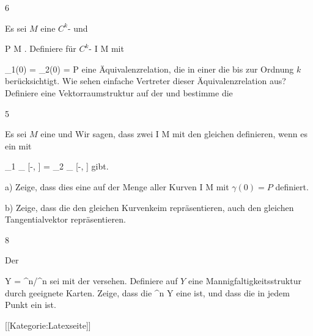 {6}
{

Es sei $M$ eine
$C^k$-
und

\mavergleichskette
{\vergleichskette
{ P
}
{ \in }{ M
}
{  }{
}
{    }{
}
{   }{
}
}
{}{}{.}
Definiere für
$C^k$-
 { I } { M
} {}
mit

\mavergleichskette
{\vergleichskette
{ \gamma_1(0)
}
{ = }{ \gamma_2(0)
}
{ = }{ P
}
{    }{
}
{   }{
}
}
{}{}{}
eine Äquivalenzrelation, die in einer
 {} {}
die
bis zur Ordnung $k$ berücksichtigt. Wie sehen einfache Vertreter dieser Äquivalenzrelation aus? Definiere eine Vektorraumstruktur auf der
und bestimme die

}
{} {}

{5}
{

Es sei $M$ eine
und
 Wir sagen, dass zwei
 { I } { M
} {}
mit
 den gleichen  {} definieren, wenn es ein
 mit

\mavergleichskettedisp
{\vergleichskette
{ \gamma_1 \!\mid_{ [-\epsilon, \epsilon]}
}
{ =} { \gamma_2 \!\mid_{ [-\epsilon, \epsilon]}
}
{ } {
}
{ } {
}
{ } {
}
}
{}{}{}
gibt.

a) Zeige, dass dies eine
auf der Menge aller Kurven
\maabb {\gamma} { I } { M
} {}
mit $\gamma(0)= P$
 {} {}
definiert.

b) Zeige, dass
die den gleichen Kurvenkeim repräsentieren, auch den gleichen Tangentialvektor repräsentieren.

}
{} {}

{8}
{

Der

\mavergleichskette
{\vergleichskette
{ Y
}
{ = }{ \R^n/\Z^n
}
{  }{
}
{    }{
}
{   }{
}
}
{}{}{}
sei mit der
versehen. Definiere auf $Y$ eine Mannigfaltigkeitsstruktur durch geeignete Karten. Zeige, dass die
\maabbdisp {\varphi} {\R^n } { Y
} {}
eine
ist, und dass die
in jedem Punkt ein
ist.

}
{} {}

 [[Kategorie:Latexseite]]
